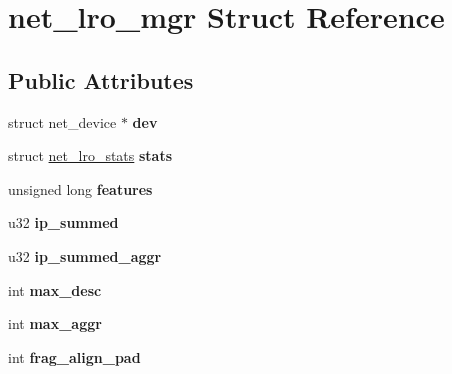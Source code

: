 \hypertarget{structnet__lro__mgr}{
\section{net\_\-lro\_\-mgr Struct Reference}
\label{structnet__lro__mgr}
}
\subsection*{Public Attributes}
\begin{DoxyCompactItemize}
\item 
\hypertarget{structnet__lro__mgr_a69fac17e923da5a4e8ae9c4e6f780c80}{
struct net\_\-device $\ast$ {\bfseries dev}}
\label{structnet__lro__mgr_a69fac17e923da5a4e8ae9c4e6f780c80}

\item 
\hypertarget{structnet__lro__mgr_a519e15d230205a56d6abb21e79314646}{
struct \hyperlink{structnet__lro__stats}{net\_\-lro\_\-stats} {\bfseries stats}}
\label{structnet__lro__mgr_a519e15d230205a56d6abb21e79314646}

\item 
\hypertarget{structnet__lro__mgr_a96f06f2bec0dff38fe62a4b9356ad662}{
unsigned long {\bfseries features}}
\label{structnet__lro__mgr_a96f06f2bec0dff38fe62a4b9356ad662}

\item 
\hypertarget{structnet__lro__mgr_ad8bd1a30c9857786c3836ad86b80d0b5}{
u32 {\bfseries ip\_\-summed}}
\label{structnet__lro__mgr_ad8bd1a30c9857786c3836ad86b80d0b5}

\item 
\hypertarget{structnet__lro__mgr_a0aa6b221259e4bc42cf1096ee63ac97a}{
u32 {\bfseries ip\_\-summed\_\-aggr}}
\label{structnet__lro__mgr_a0aa6b221259e4bc42cf1096ee63ac97a}

\item 
\hypertarget{structnet__lro__mgr_abcd6a75d2434cd3e349f7966cdf93aa8}{
int {\bfseries max\_\-desc}}
\label{structnet__lro__mgr_abcd6a75d2434cd3e349f7966cdf93aa8}

\item 
\hypertarget{structnet__lro__mgr_a136944534c101f45ad53f22c9f4d79e2}{
int {\bfseries max\_\-aggr}}
\label{structnet__lro__mgr_a136944534c101f45ad53f22c9f4d79e2}

\item 
\hypertarget{structnet__lro__mgr_aab85e89d3ddaa147b6e943f720b539a8}{
int {\bfseries frag\_\-align\_\-pad}}
\label{structnet__lro__mgr_aab85e89d3ddaa147b6e943f720b539a8}


\end{DoxyCompactItemize}
